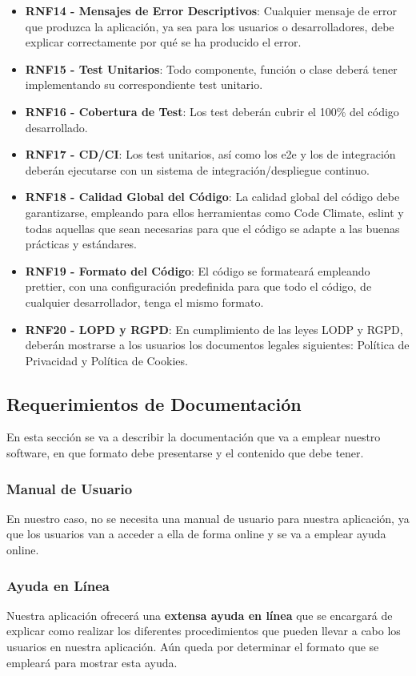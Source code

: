 \begin{itemize}
	\item \textbf{RNF14 - Mensajes de Error Descriptivos}: Cualquier mensaje de error que produzca la aplicación, ya sea para los usuarios o desarrolladores, debe explicar correctamente por qué se ha producido el error.
	\item \textbf{RNF15 - Test Unitarios}: Todo componente, función o clase deberá tener implementando su correspondiente test unitario.
	\item \textbf{RNF16 - Cobertura de Test}: Los test deberán cubrir el 100\% del código desarrollado.
	\item \textbf{RNF17 - CD/CI}: Los test unitarios, así como los e2e y los de integración deberán ejecutarse con un sistema de integración/despliegue continuo.
	\item \textbf{RNF18 - Calidad Global del Código}: La calidad global del código debe garantizarse, empleando para ellos herramientas como Code Climate, eslint y todas aquellas que sean necesarias para que el código se adapte a las buenas prácticas y estándares.
	\item \textbf{RNF19 - Formato del Código}: El código se formateará empleando prettier, con una configuración predefinida para que todo el código, de cualquier desarrollador, tenga el mismo formato.
	\item \textbf{RNF20 - LOPD y RGPD}: En cumplimiento de las leyes LODP y RGPD, deberán mostrarse a los usuarios los documentos legales siguientes: Política de Privacidad y Política de Cookies.
\end{itemize}

\subsection{Requerimientos de Documentación}
En esta sección se va a describir la documentación que va a emplear nuestro software, en que formato debe presentarse y el contenido que debe tener. 

\subsubsection{Manual de Usuario}
En nuestro caso, no se necesita una manual de usuario para nuestra aplicación, ya que los usuarios van a acceder a ella de forma online y se va a emplear ayuda online.

\subsubsection{Ayuda en Línea}
Nuestra aplicación ofrecerá una \textbf{extensa ayuda en línea} que se encargará de explicar como realizar los diferentes procedimientos que pueden llevar a cabo los usuarios en nuestra aplicación. Aún queda por determinar el formato que se empleará para mostrar esta ayuda. 																																					

